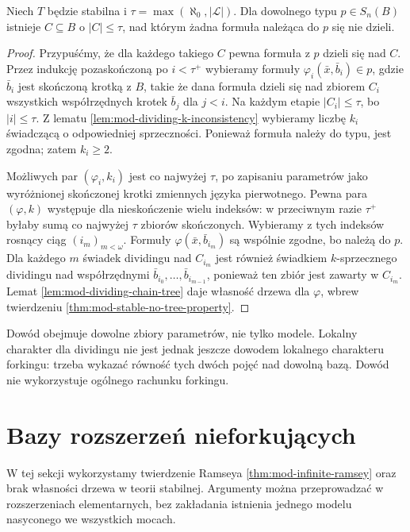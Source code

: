 \begin{twierdzenie}
\label{thm:mod-dividing-local-character}
Niech $T$ będzie stabilna i
$\tau=\max(\aleph_0,|\mathcal L|)$.
Dla dowolnego typu $p\in S_n(B)$ istnieje
$C\subseteq B$ o $|C|\leq\tau$,
nad którym żadna formuła należąca do $p$
się nie dzieli.
\end{twierdzenie}
\begin{proof}
Przypuśćmy, że dla każdego takiego $C$
pewna formuła z $p$ dzieli się nad $C$.
Przez indukcję pozaskończoną po
$i<\tau^+$ wybieramy formuły
$\varphi_i(\bar x,\bar b_i)\in p$,
gdzie $\bar b_i$ jest skończoną krotką z $B$,
takie że dana formuła dzieli się nad zbiorem
$C_i$ wszystkich współrzędnych krotek
$\bar b_j$ dla $j<i$.
Na każdym etapie $|C_i|\leq\tau$,
bo $|i|\leq\tau$.
Z lematu \ref{lem:mod-dividing-k-inconsistency}
wybieramy liczbę $k_i$ świadczącą
o odpowiedniej sprzeczności.
Ponieważ formuła należy do typu,
jest zgodna; zatem $k_i\geq2$.

Możliwych par $(\varphi_i,k_i)$ jest
co najwyżej $\tau$, po zapisaniu
parametrów jako wyróżnionej skończonej
krotki zmiennych języka pierwotnego.
Pewna para $(\varphi,k)$ występuje
dla nieskończenie wielu indeksów:
w przeciwnym razie $\tau^+$ byłaby sumą
co najwyżej $\tau$ zbiorów skończonych.
Wybieramy z tych indeksów rosnący ciąg
$(i_m)_{m<\omega}$.
Formuły $\varphi(\bar x,\bar b_{i_m})$
są wspólnie zgodne, bo należą do $p$.
Dla każdego $m$ świadek dividingu nad $C_{i_m}$
jest również świadkiem $k$-sprzecznego
dividingu nad współrzędnymi
$\bar b_{i_0},\ldots,\bar b_{i_{m-1}}$,
ponieważ ten zbiór jest zawarty w $C_{i_m}$.
Lemat \ref{lem:mod-dividing-chain-tree}
daje własność drzewa dla $\varphi$,
wbrew twierdzeniu
\ref{thm:mod-stable-no-tree-property}.
\end{proof}

Dowód obejmuje dowolne zbiory parametrów,
nie tylko modele. Lokalny charakter dla
dividingu nie jest jednak jeszcze dowodem
lokalnego charakteru forkingu: trzeba
wykazać równość tych dwóch pojęć nad
dowolną bazą. Dowód nie wykorzystuje ogólnego rachunku
forkingu.

\section{Bazy rozszerzeń nieforkujących}

W tej sekcji wykorzystamy twierdzenie Ramseya
\ref{thm:mod-infinite-ramsey} oraz brak własności
drzewa w teorii stabilnej.
Argumenty można przeprowadzać w rozszerzeniach
elementarnych, bez zakładania istnienia jednego
modelu nasyconego we wszystkich mocach.

